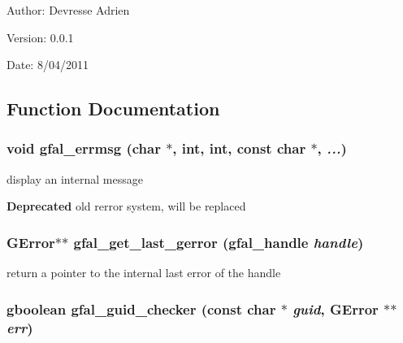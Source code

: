 \begin{Desc}
\item[Author:]Devresse Adrien \end{Desc}
\begin{Desc}
\item[Version:]0.0.1 \end{Desc}
\begin{Desc}
\item[Date:]8/04/2011 \end{Desc}


\subsection{Function Documentation}
\subsubsection{\setlength{\rightskip}{0pt plus 5cm}void gfal\_\-errmsg (char $\ast$, int, int, const char $\ast$,  {\em ...})}\label{gfal__common_8h_53a1e14d422fda082f71f520468b79b3}


display an internal message 

\begin{Desc}
\item[\bf{Deprecated}]old rerror system, will be replaced \end{Desc}
\subsubsection{\setlength{\rightskip}{0pt plus 5cm}GError$\ast$$\ast$ gfal\_\-get\_\-last\_\-gerror (gfal\_\-handle {\em handle})}\label{gfal__common_8h_5db6cc7aef8f56e6b1b69f903d9c5411}


return a pointer to the internal last error of the handle 
\subsubsection{\setlength{\rightskip}{0pt plus 5cm}gboolean gfal\_\-guid\_\-checker (const char $\ast$ {\em guid}, GError $\ast$$\ast$ {\em err})}\label{gfal__common_8h_9e4b6149b0256f725bc1dab5fc32ab62}



